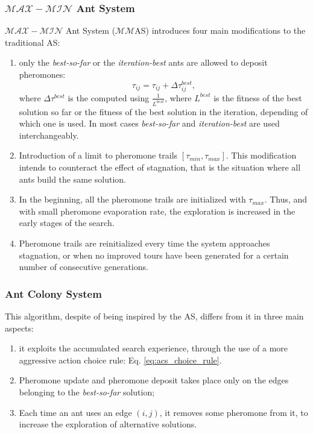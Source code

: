 					\subsubsection*{$\mathcal{MAX}-\mathcal{MIN}$ Ant System}
					$\mathcal{MAX}-\mathcal{MIN}$ Ant System ($\mathcal{MM}$AS) introduces four main modifications to the traditional AS:
					\begin{enumerate}
						\item only the \emph{best-so-far} or the \emph{iteration-best} ants are allowed to deposit pheromones:
							\begin{equation}
								\label{eq:max_min_rank_pheromone_update}
								\tau_{ij} = \tau_{ij} + \Delta\tau_{ij}^{best},
							\end{equation}
							\noindent where $\Delta\tau^{best}$ is the computed using $\frac{1} {L^{best}}$, where ${L^{best}}$ is the fitness of the best solution so far or the fitness of the best solution in the iteration, depending of which one is used. In most cases \emph{best-so-far} and \emph{iteration-best} are used interchangeably.
						
						\item Introduction of a limit to pheromone trails $[\tau_{min},\tau_{max}]$. This modification intends to counteract the effect of stagnation, that is the situation where all ants build the same solution.
						
						\item In the beginning, all the pheromone trails are initialized with $\tau_{max}$. Thus, and with small pheromone evaporation rate, the exploration is increased in the early stages of the search.
						
						\item Pheromone trails are reinitialized every time the system approaches stagnation, or when no improved tours have been generated for a certain number of consecutive generations.
						 					
					\end{enumerate}
		
					\subsubsection*{Ant Colony System}
					\label{sec:acs}
					This algorithm, despite of being inspired by the AS, differs from it in three main aspects:
					\begin{enumerate}
						\item it exploits the accumulated search experience, through the use of a more aggressive action choice rule: Eq. \ref{eq:acs_choice_rule}. 
						\item Pheromone update and pheromone deposit takes place only on the edges belonging to the \emph{best-so-far} solution;
						\item Each time an ant uses an edge $(i,j)$, it removes some pheromone from it, to increase the exploration of alternative solutions.
					\end{enumerate}


